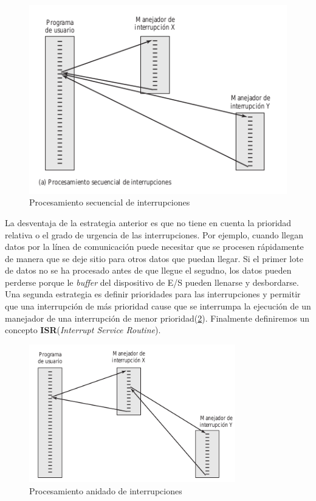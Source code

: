 \documentclass{article}
\begin{document}
							\begin{figure}
							\caption{Procesamiento secuencial de interrupciones}
							\label{figura9:secuencial}
							\centering
							\includegraphics[width=1\textwidth, scale=1]{figura9.png}
							\end{figure}
							
							La desventaja de la estrategia anterior es que no tiene en cuenta la prioridad relativa o el grado de urgencia de las interrupciones. Por ejemplo, cuando llegan datos por la línea de comunicación puede necesitar que se procesen rápidamente de manera que se deje sitio para otros datos que puedan llegar. Si el primer lote de datos no se ha procesado antes de que llegue el segudno, los datos pueden perderse porque le \textit{buffer} del dispositivo de E/S pueden llenarse y desbordarse. \\
							
							Una segunda estrategia es definir prioridades para las interrupciones y permitir que una interrupción de más prioridad cause que se interrumpa la ejecución de un manejador de una interrupción de menor prioridad(\ref{figura10:anidado}). Finalmente definiremos un concepto \textbf{ISR}(\textit{Interrupt Service Routine}).
							
							\begin{figure}
							\caption{Procesamiento anidado de interrupciones}
							\label{figura10:anidado}
							\centering
							\includegraphics[width=0.8\textwidth, scale=1]{figura10.png}
							\end{figure}
							
\end{document}
